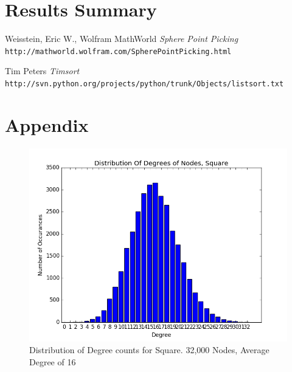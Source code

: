 \documentclass{article}
\begin{document}
\section{Results Summary}

\newpage

\begin{thebibliography}{10}
    Weisstein, Eric W., Wolfram MathWorld
    \textit{Sphere Point Picking}
    \texttt{http://mathworld.wolfram.com/SpherePointPicking.html}

    Tim Peters
    \textit{Timsort}
    \texttt{http://svn.python.org/projects/python/trunk/Objects/listsort.txt}

\end{thebibliography}

\newpage

\section{Appendix}

\begin{center}
    \begin{figure}
        \includegraphics[scale=0.45]{./graphs/hist_deg_square.png}
        \caption{Distribution of Degree counts for Square. 32,000 Nodes, Average Degree of 16}
        \label{squaredeghist}
    \end{figure}
\end{center}
\end{document}
